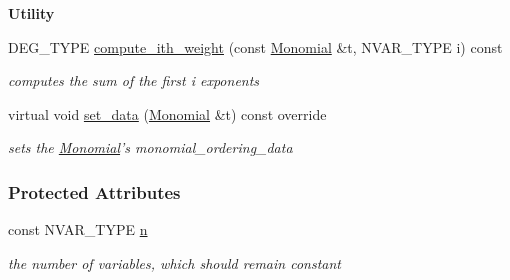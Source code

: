 \begin{Indent}\textbf{ Utility}\par
\begin{DoxyCompactItemize}
\item 
\mbox{\label{group__orderinggroup_a8c65377ef8f3015a6c03ef933b37550a}} 
D\+E\+G\+\_\+\+T\+Y\+PE \hyperlink{group__orderinggroup_a8c65377ef8f3015a6c03ef933b37550a}{compute\+\_\+ith\+\_\+weight} (const \hyperlink{group__polygroup_class_monomial}{Monomial} \&t, N\+V\+A\+R\+\_\+\+T\+Y\+PE i) const
\begin{DoxyCompactList}\small\item\em computes the sum of the first i exponents \end{DoxyCompactList}\item 
\mbox{\label{group__orderinggroup_a83abd3e7505fe2096b01b8146bfdd83f}} 
virtual void \hyperlink{group__orderinggroup_a83abd3e7505fe2096b01b8146bfdd83f}{set\+\_\+data} (\hyperlink{group__polygroup_class_monomial}{Monomial} \&t) const override
\begin{DoxyCompactList}\small\item\em sets the \hyperlink{group__polygroup_class_monomial}{Monomial}'s {\ttfamily monomial\+\_\+ordering\+\_\+data} \end{DoxyCompactList}\end{DoxyCompactItemize}
\end{Indent}
\subsubsection*{Protected Attributes}
\begin{DoxyCompactItemize}
\item 
\mbox{\label{group__orderinggroup_a3fa495befedef829c12097e239fea97f}} 
const N\+V\+A\+R\+\_\+\+T\+Y\+PE \hyperlink{group__orderinggroup_a3fa495befedef829c12097e239fea97f}{n}
\begin{DoxyCompactList}\small\item\em the number of variables, which should remain constant \end{DoxyCompactList}\end{DoxyCompactItemize}


